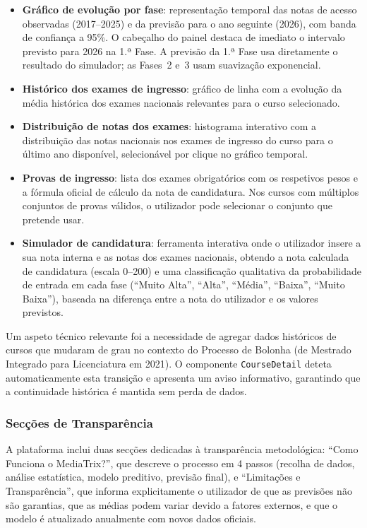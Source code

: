 \documentclass[12pt,a4paper]{article}
\begin{document}
\begin{itemize}
  \item \textbf{Gráfico de evolução por fase}: representação temporal das notas de acesso observadas (2017--2025) e da previsão para o ano seguinte (2026), com banda de confiança a 95\%. O cabeçalho do painel destaca de imediato o intervalo previsto para 2026 na 1.ª Fase. A previsão da 1.ª Fase usa diretamente o resultado do simulador; as Fases~2 e~3 usam suavização exponencial.

  \item \textbf{Histórico dos exames de ingresso}: gráfico de linha com a evolução da média histórica dos exames nacionais relevantes para o curso selecionado.

  \item \textbf{Distribuição de notas dos exames}: histograma interativo com a distribuição das notas nacionais nos exames de ingresso do curso para o último ano disponível, selecionável por clique no gráfico temporal.

  \item \textbf{Provas de ingresso}: lista dos exames obrigatórios com os respetivos pesos e a fórmula oficial de cálculo da nota de candidatura. Nos cursos com múltiplos conjuntos de provas válidos, o utilizador pode selecionar o conjunto que pretende usar.

  \item \textbf{Simulador de candidatura}: ferramenta interativa onde o utilizador insere a sua nota interna e as notas dos exames nacionais, obtendo a nota calculada de candidatura (escala 0--200) e uma classificação qualitativa da probabilidade de entrada em cada fase (``Muito Alta'', ``Alta'', ``Média'', ``Baixa'', ``Muito Baixa''), baseada na diferença entre a nota do utilizador e os valores previstos.
\end{itemize}

Um aspeto técnico relevante foi a necessidade de agregar dados históricos de cursos que mudaram de grau no contexto do Processo de Bolonha (de Mestrado Integrado para Licenciatura em 2021). O componente \texttt{CourseDetail} deteta automaticamente esta transição e apresenta um aviso informativo, garantindo que a continuidade histórica é mantida sem perda de dados.

\subsubsection{Secções de Transparência}

A plataforma inclui duas secções dedicadas à transparência metodológica: ``Como Funciona o MediaTrix?'', que descreve o processo em 4 passos (recolha de dados, análise estatística, modelo preditivo, previsão final), e ``Limitações e Transparência'', que informa explicitamente o utilizador de que as previsões não são garantias, que as médias podem variar devido a fatores externos, e que o modelo é atualizado anualmente com novos dados oficiais.
\end{document}
